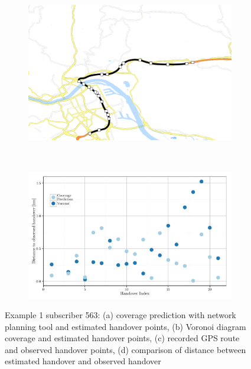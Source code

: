 \begin{figure}
	\begin{subfigure}[b]{0.5\linewidth}
			\includegraphics[width=\textwidth]{./images/563_Handover}
			\caption{}
			\label{fig:563handover}
		\end{subfigure}%
		~
		\begin{subfigure}[b]{0.5\linewidth}
			\includegraphics[width=\textwidth]{./images/563_predvorcomp}
			\caption{}
			\label{fig:563distcomp}
		\end{subfigure}
	
	\caption{Example 1 subscriber 563: (a) coverage prediction with network planning tool and estimated handover points, (b) Voronoi diagram coverage and estimated handover points, (c) recorded GPS route and observed handover points, (d) comparison of distance between estimated handover and observed handover}\label{fig:563overview}
\end{figure}



